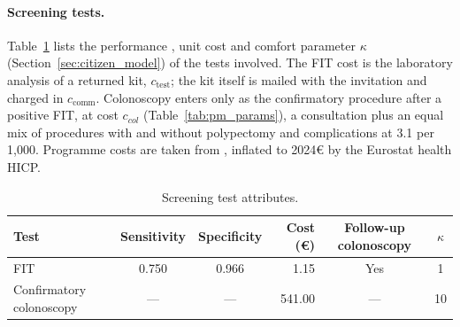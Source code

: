 \documentclass[12pt]{article}
\begin{document}
\paragraph{Screening tests.} Table~\ref{tab:screening_tests} lists the performance \citep{barre2020cost}, unit cost \citep{arrospide2018cost} and comfort parameter $\kappa$ (Section~\ref{sec:citizen_model}) of the tests involved. The FIT cost is the laboratory analysis of a returned kit, $c_{\text{test}}$; the kit itself is mailed with the invitation and charged in $c_{\text{comm}}$. Colonoscopy enters only as the confirmatory procedure after a positive FIT, at cost $c_{col}$ (Table~\ref{tab:pm_params}), a consultation plus an equal mix of procedures with and without polypectomy and complications at 3.1 per 1{,}000. Programme costs are taken from \citet{arrospide2018cost}, inflated to 2024€ by the Eurostat health HICP.
\begin{table}[h!]
\centering
\footnotesize
\caption{Screening test attributes.}
\label{tab:screening_tests}
\renewcommand{\arraystretch}{1.2}
\begin{tabular}{l c c r c c}
\toprule
\textbf{Test} & \textbf{Sensitivity} & \textbf{Specificity} & \textbf{Cost (€)} & \textbf{Follow-up colonoscopy} & $\kappa$ \\
\midrule
FIT                     & 0.750 & 0.966 & 1.15   & Yes & 1  \\
Confirmatory colonoscopy & ---   & ---   & 541.00 & ---  & 10 \\
\bottomrule
\end{tabular}
\end{table}
\end{document}
